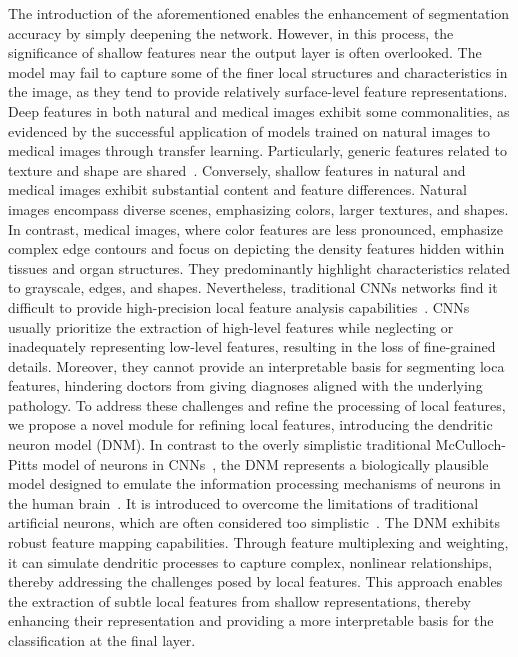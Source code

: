 \documentclass[review]{elsarticle}
\begin{document}
	The introduction of the aforementioned enables the enhancement of segmentation accuracy by simply deepening the network. However, in this process, the significance of shallow features near the output layer is often overlooked. The model may fail to capture some of the finer local structures and characteristics in the image, as they tend to provide relatively surface-level feature representations. Deep features in both natural and medical images exhibit some commonalities, as evidenced by the successful application of models trained on natural images to medical images through transfer learning. Particularly, generic features related to texture and shape are shared~\cite{cheplygina2019cats,karimi2021transfer}. Conversely, shallow features in natural and medical images exhibit substantial content and feature differences. Natural images encompass diverse scenes, emphasizing colors, larger textures, and shapes. In contrast, medical images, where color features are less pronounced, emphasize complex edge contours and focus on depicting the density features hidden within tissues and organ structures. They predominantly highlight characteristics related to grayscale, edges, and shapes. Nevertheless, traditional CNNs networks find it difficult to provide high-precision local feature analysis capabilities~\cite{li2024scribformer}. CNNs usually prioritize the extraction of high-level features while neglecting or inadequately representing low-level features, resulting in the loss of fine-grained details. Moreover, they cannot provide an interpretable basis for segmenting loca features, hindering doctors from giving diagnoses aligned with the underlying pathology. To address these challenges and refine the processing of local features, we propose a novel module for refining local features, introducing the dendritic neuron model (DNM). In contrast to the overly simplistic traditional McCulloch-Pitts model of neurons in CNNs~\cite{mcculloch1943logical}, the DNM represents a biologically plausible model designed to emulate the information processing mechanisms of neurons in the human brain~\cite{gao2018dendritic}. It is introduced to overcome the limitations of traditional artificial neurons, which are often considered too simplistic~\cite{zhou2016financial}. The DNM exhibits robust feature mapping capabilities. Through feature multiplexing and weighting, it can simulate dendritic processes to capture complex, nonlinear relationships, thereby addressing the challenges posed by local features. This approach enables the extraction of subtle local features from shallow representations, thereby enhancing their representation and providing a more interpretable basis for the classification at the final layer.
 
\end{document}
